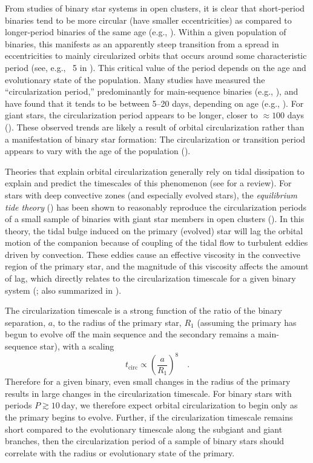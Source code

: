 \documentclass[modern, letterpaper]{aastex62}
\begin{document}
From studies of binary star systems in open clusters, it is clear that
short-period binaries tend to be more circular (have smaller eccentricities) as
compared to longer-period binaries of the same age (e.g.,
\citealt{Mathieu:2005}).
Within a given population of binaries, this manifests as an apparently steep
transition from a spread in eccentricities to mainly circularized orbits
that occurs around some characteristic period (see, e.g., \figurename~5 in
\citealt{Mathieu:2005}).
This critical value of the period depends on the age and evolutionary state of
the population.
Many studies have measured the ``circularization period,'' predominantly for
main-sequence binaries (e.g., \citealt{Meibom:2006, Kjurkchieva:2017}), and have
found that it tends to be between 5--20 days, depending on age (e.g.,
\citealt{Mathieu:1988}).
For giant stars, the circularization period appears to be longer, closer to
$\approx 100$ days (\citealt{Mayor:1984}).
These observed trends are likely a result of orbital circularization rather than
a manifestation of binary star formation: The circularization or transition
period appears to vary with the age of the population (\citealt{Meibom:2005}).

Theories that explain orbital circularization generally rely on tidal
dissipation to explain and predict the timescales of this phenomenon (see
\citealt{Mazeh:2007hp} for a review).
For stars with deep convective zones (and especially evolved stars), the
\emph{equilibrium tide theory} (\citealt{Zahn:1977, Zahn:1989}) has been shown
to reasonably reproduce the circularization periods of a small sample of
binaries with giant star members in open clusters (\citealt{Verbunt:1995}).
In this theory, the tidal bulge induced on the primary (evolved) star will lag
the orbital motion of the companion because of coupling of the tidal flow to
turbulent eddies driven by convection.
These eddies cause an effective viscosity in the convective region of the
primary star, and the magnitude of this viscosity affects the amount of lag,
which directly relates to the circularization timescale for a given binary
system (\citealt{Zahn:1989}; also summarized in \citealt{Goodman:1997}).

The circularization timescale is a strong function of the ratio of the binary
separation, $a$, to the radius of the primary star, $R_1$ (assuming the primary
has begun to evolve off the main sequence and the secondary remains a
main-sequence star), with a scaling
\begin{equation}
    t_\textrm{circ} \propto \left(\frac{a}{R_1}\right)^8 \quad .
\end{equation}
Therefore for a given binary, even small changes in the radius of the primary
results in large changes in the circularization timescale.
For binary stars with periods $P \gtrsim 10~\textrm{day}$, we therefore expect
orbital circularization to begin only as the primary begins to evolve.
Further, if the circularization timescale remains short compared to the
evolutionary timescale along the subgiant and giant branches, then the
circularization period of a sample of binary stars should correlate with the
radius or evolutionary state of the primary.
\end{document}
